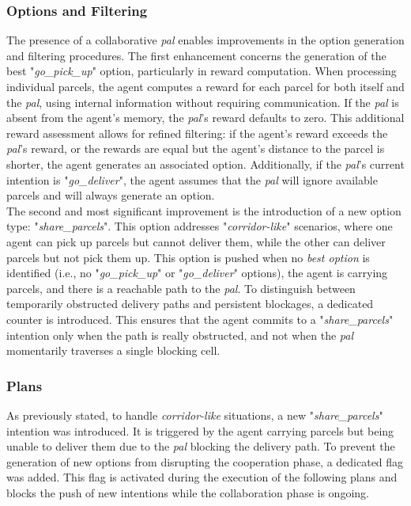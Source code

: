             \subsubsection{Options and Filtering}
                The presence of a collaborative \textit{pal} enables improvements in the option generation and filtering procedures. The first enhancement concerns the generation of the best "\textit{go\_pick\_up}" option, particularly in reward computation. When processing individual parcels, the agent computes a reward for each parcel for both itself and the \textit{pal}, using internal information without requiring communication. If the \textit{pal} is absent from the agent's memory, the \textit{pal}'s reward defaults to zero. This additional reward assessment allows for refined filtering: if the agent's reward exceeds the \textit{pal}'s reward, or the rewards are equal but the agent's distance to the parcel is shorter, the agent generates an associated option. Additionally, if the \textit{pal}'s current intention is "\textit{go\_deliver}", the agent assumes that the \textit{pal} will ignore available parcels and will always generate an option.
                \medskip\\
                The second and most significant improvement is the introduction of a new option type: "\textit{share\_parcels}". This option addresses "\textit{corridor-like}" scenarios, where one agent can pick up parcels but cannot deliver them, while the other can deliver parcels but not pick them up. This option is pushed when no \textit{best option} is identified (i.e., no "\textit{go\_pick\_up}" or "\textit{go\_deliver}" options), the agent is carrying parcels, and there is a reachable path to the \textit{pal}. To distinguish between temporarily obstructed delivery paths and persistent blockages, a dedicated counter is introduced. This ensures that the agent commits to a "\textit{share\_parcels}" intention only when the path is really obstructed, and not when the \textit{pal} momentarily traverses a single blocking cell.
            
            \subsubsection{Plans}\label{shareRequest}
                As previously stated, to handle \textit{corridor-like} situations, a new "\textit{share\_parcels}" intention was introduced. It is triggered by the agent carrying parcels but being unable to deliver them due to the \textit{pal} blocking the delivery path. To prevent the generation of new options from disrupting the cooperation phase, a dedicated flag was added. This flag is activated during the execution of the following plans and blocks the push of new intentions while the collaboration phase is ongoing.

